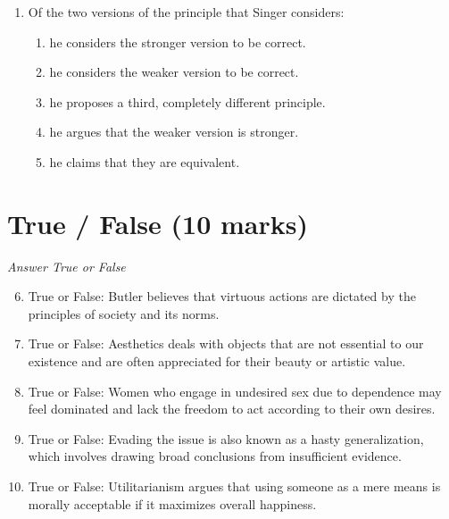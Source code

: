 \documentclass[12pt]{article}
\begin{document}
\begin{enumerate}[label=\arabic*.]
\begin{enumerate}[label=(\alph*)]
    \item autonomous
    \item consequential
    \item hypothetical
    \item practical
\end{enumerate}
\item Of the two versions of the principle that Singer considers:
\begin{enumerate}[label=(\alph*)]
    \item he considers the stronger version to be correct.
    \item he considers the weaker version to be correct.
    \item he proposes a third, completely different principle.
    \item he argues that the weaker version is stronger.
    \item he claims that they are equivalent.
\end{enumerate}
\end{enumerate}

\section*{True / False (10 marks)}
\textit{Answer True or False}
\begin{enumerate}[label=\arabic*.]
\setcounter{enumi}{5}
\item True or False: Butler believes that virtuous actions are dictated by the principles of society and its norms.
\item True or False: Aesthetics deals with objects that are not essential to our existence and are often appreciated for their beauty or artistic value.
\item True or False: Women who engage in undesired sex due to dependence may feel dominated and lack the freedom to act according to their own desires.
\item True or False: Evading the issue is also known as a hasty generalization, which involves drawing broad conclusions from insufficient evidence.
\item True or False: Utilitarianism argues that using someone as a mere means is morally acceptable if it maximizes overall happiness.
\end{enumerate}
\end{document}
